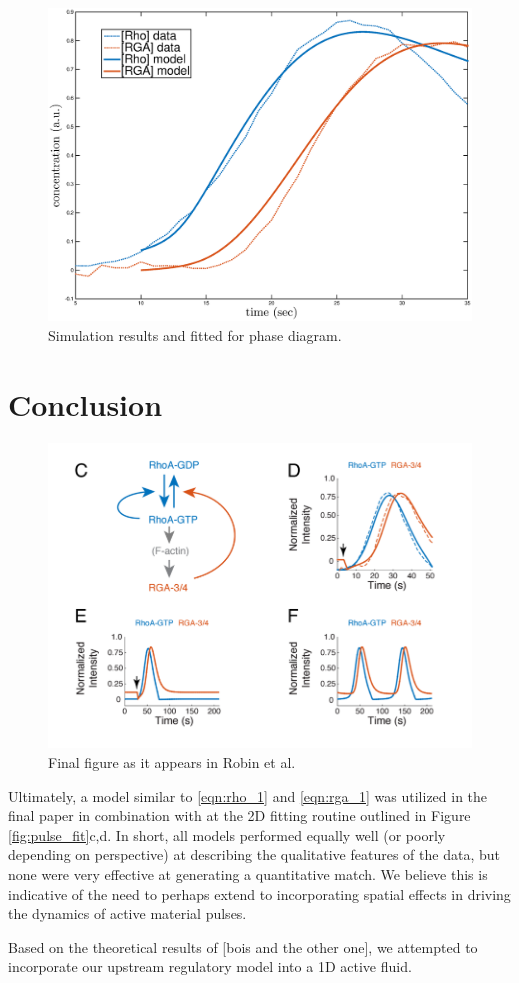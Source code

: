 \begin{figure}[h!]
\centering
\includegraphics[width=\hsize]{pulse/model_profile.eps}
\caption{\label{fig:pulse_fit_phase}  Simulation results and fitted for phase diagram.}
\end{figure}




\section{Conclusion}
\begin{figure}[h!]
\centering
\includegraphics[width=\hsize]{pulse/final_fig.png}
\caption{\label{fig:pulse_final}  Final figure as it appears in Robin et al.}
\end{figure}
Ultimately, a model similar to \ref{eqn:rho_1} and \ref{eqn:rga_1} was utilized in the final paper in combination with at the 2D fitting routine outlined in Figure \ref{fig:pulse_fit}c,d.   In short, all models performed equally well (or poorly depending on perspective) at describing the qualitative features of the data, but none were very effective at generating a quantitative match.    We believe this is indicative of the need to perhaps extend to incorporating spatial effects in driving the dynamics of active material pulses.

Based on the theoretical results of [bois and the other one], we attempted to incorporate our upstream regulatory model into a 1D active fluid.  

